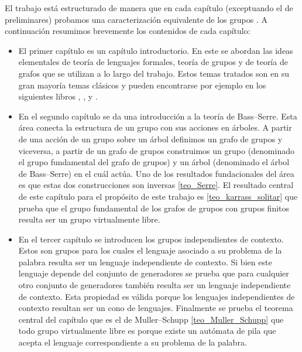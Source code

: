 \documentclass[tesis.tex]{subfiles}
\begin{document}
	El trabajo está estructurado de manera que en cada capítulo (exceptuando el de 
	preliminares) probamos una caracterización equivalente de los grupos \vls.
	A continuación resumimos brevemente los contenidos de cada capítulo:
	\begin{itemize}
		\item 
			El primer capítulo es un capítulo introductorio.
			En este se abordan las ideas elementales de teoría de lenguajes formales, teoría de grupos y de teoría de grafos que se utilizan a lo largo del trabajo.
			Estos temas tratados son en su gran mayoría temas clásicos y pueden encontrarse por ejemplo en los siguientes libros \cite{lyndon1977combinatorial}, \cite{diestel2005graph}, \cite{gallier2022mathematical} y \cite{hopcraft-ullman}.
		
		\item 
			En el segundo capítulo se da una introducción a la teoría de Bass--Serre. 
			Esta área conecta la estructura de un grupo con sus acciones en árboles.
			A partir de una acción de un grupo sobre un árbol definimos un grafo de grupos y viceversa, a partir de un grafo de grupos construimos un grupo (denominado el grupo fundamental del grafo de grupos) y un árbol (denominado el árbol de Bass--Serre) en el cuál actúa.
			Uno de los resultados fundacionales del área es que estas dos construcciones son inversas \ref{teo_Serre}.
			El resultado central de este capítulo para el propósito de este trabajo es \ref{teo_karrass_solitar} que prueba que el grupo fundamental de los grafos de grupos con grupos finitos resulta ser un grupo virtualmente libre.

		\item 
			En el tercer capítulo se introducen los grupos independientes de contexto.
			Estos son grupos para los cuales el lenguaje asociado a su problema de la palabra resulta ser un lenguaje independiente de contexto.
			Si bien este lenguaje depende del conjunto de generadores se prueba que para cualquier otro conjunto de generadores también resulta ser un lenguaje independiente de contexto.
			Esta propiedad es válida porque los lenguajes independientes de contexto resultan ser un cono de lenguajes.
			Finalmente se prueba el teorema central del capítulo que es el de Muller--Schupp \ref{teo_Muller_Schupp} que todo grupo virtualmente libre es \ic porque existe un autómata de pila que acepta el lenguaje correspondiente a su problema de la palabra. 
			

\end{itemize}
\end{document}
